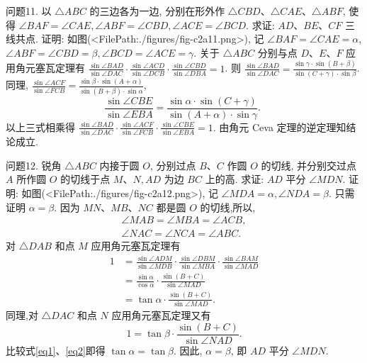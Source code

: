 问题11. 以 $\triangle A B C$ 的三边各为一边, 分别在形外作 $\triangle C B D 、 \triangle C A E 、 \triangle A B F$, 使得 $\angle B A F=\angle C A E, \angle A B F=\angle C B D, \angle A C E=\angle B C D$.
求证: $A D 、 B E 、 C F$ 三线共点.
证明: 如图(<FilePath:./figures/fig-c2a11.png>), 记 $\angle B A F=\angle C A E=\alpha$, $\angle A B F=\angle C B D=\beta, \angle B C D=\angle A C E=\gamma$.
关于 $\triangle A B C$ 分别与点 $D 、 E 、 F$ 应用角元塞瓦定理有 $\frac{\sin \angle B A D}{\sin \angle D A C} \cdot \frac{\sin \angle A C D}{\sin \angle D C B} \cdot \frac{\sin \angle C B D}{\sin \angle D B A}=1$. 则 $\frac{\sin \angle B A D}{\sin \angle D A C}=\frac{\sin \gamma \cdot \sin (B+\beta)}{\sin (C+\gamma) \cdot \sin \beta}$.
同理, $\frac{\sin \angle A C F}{\sin \angle F C B}=\frac{\sin \beta \cdot \sin (A+\alpha)}{\sin (B+\beta) \cdot \sin \alpha}$,
$$
\frac{\sin \angle C B E}{\sin \angle E B A}=\frac{\sin \alpha \cdot \sin (C+\gamma)}{\sin (A+\alpha) \cdot \sin \gamma} \text {. }
$$
以上三式相乘得 $\frac{\sin \angle B A D}{\sin \angle D A C} \cdot \frac{\sin \angle A C F}{\sin \angle F C B} \cdot \frac{\sin \angle C B E}{\sin \angle E B A}=1$.
由角元 Ceva 定理的逆定理知结论成立.



问题12. 锐角 $\triangle A B C$ 内接于圆 $O$, 分别过点 $B 、 C$ 作圆 $O$ 的切线, 并分别交过点 $A$ 所作圆 $O$ 的切线于点 $M 、 N, A D$ 为边 $B C$ 上的高.
求证: $A D$ 平分 $\angle M D N$.
证明: 如图(<FilePath:./figures/fig-c2a12.png>), 记 $\angle M D A=\alpha, \angle N D A=\beta$. 只需证明 $\alpha=\beta$.
因为 $M N 、 M B 、 N C$ 都是圆 $O$ 的切线,所以,
$$
\begin{gathered}
\angle M A B=\angle M B A=\angle A C B, \\
\angle N A C=\angle N C A=\angle A B C .
\end{gathered}
$$
对 $\triangle D A B$ 和点 $M$ 应用角元塞瓦定理有
$$
\begin{aligned}
1 & =\frac{\sin \angle A D M}{\sin \angle M D B} \cdot \frac{\sin \angle D B M}{\sin \angle M B A} \cdot \frac{\sin \angle B A M}{\sin \angle M A D} \\
& =\frac{\sin \alpha}{\cos \alpha} \cdot \frac{\sin (B+C)}{\sin \angle M A D} \\
& =\tan \alpha \cdot \frac{\sin (B+C)}{\sin \angle M A D} . 
\end{aligned} \label{eq1}
$$
同理,对 $\triangle D A C$ 和点 $N$ 应用角元塞瓦定理又有
$$
1=\tan \beta \cdot \frac{\sin (B+C)}{\sin \angle N A D} . \label{eq2}
$$
比较式\ref{eq1}、\ref{eq2}即得 $\tan \alpha=\tan \beta$.
因此, $\alpha=\beta$, 即 $A D$ 平分 $\angle M D N$.



